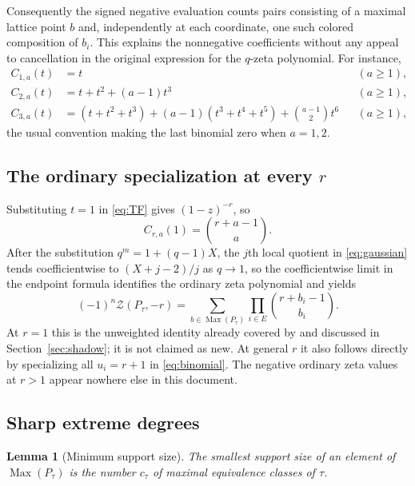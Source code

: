 \documentclass[11pt]{article}
\numberwithin{equation}{section}
\newtheorem{lemma}[theorem]{Lemma}
\theoremstyle{definition}
\theoremstyle{remark}
\newcommand{\Max}{\operatorname{Max}}
\newcommand{\Zeta}{\mathcal Z}
\begin{document}
Consequently the signed negative evaluation counts pairs consisting of a
maximal lattice point $b$ and, independently at each coordinate, one such
colored composition of $b_i$. This explains the nonnegative coefficients
without any appeal to cancellation in the original expression for the $q$-zeta
polynomial. For instance,
\begin{align*}
 C_{1,a}(t)&=t &&(a\ge1),\\
 C_{2,a}(t)&=t+t^2+(a-1)t^3 &&(a\ge1),\\
 C_{3,a}(t)&=(t+t^2+t^3)+(a-1)(t^3+t^4+t^5)+\binom{a-1}{2}t^6 &&(a\ge1),
\end{align*}
the usual convention making the last binomial zero when $a=1,2$.

\subsection{The ordinary specialization at every \texorpdfstring{$r$}{r}}

Substituting $t=1$ in \eqref{eq:TF} gives $(1-z)^{-r}$, so
\begin{equation}
 C_{r,a}(1)=\binom{r+a-1}{a}.
 \label{eq:Cordinary}
\end{equation}
After the substitution $q^m=1+(q-1)X$, the $j$th local quotient in
\eqref{eq:gaussian} tends coefficientwise to $(X+j-2)/j$ as $q\to1$, so the
coefficientwise limit in the endpoint formula identifies the ordinary zeta
polynomial and yields
\begin{equation}
 (-1)^n \Zeta(P_\tau,-r)=
 \sum_{b\in \Max(P_\tau)}\prod_{i\in E}\binom{r+b_i-1}{b_i}.
 \label{eq:ordinary-r}
\end{equation}
At $r=1$ this is the unweighted identity already covered by
\cite{PriorReciprocity} and discussed in Section~\ref{sec:shadow}; it is not
claimed as new. At general $r$ it also follows directly by specializing all
$u_i=r+1$ in \eqref{eq:binomial}. The negative ordinary zeta values at $r>1$
appear nowhere else in this document.

\subsection{Sharp extreme degrees}
\label{sec:degrees}

\begin{lemma}[Minimum support size]
\label{lem:minsupp}
The smallest support size of an element of $\Max(P_\tau)$ is the number
$c_\tau$ of maximal equivalence classes of $\tau$.
\end{lemma}
\end{document}
